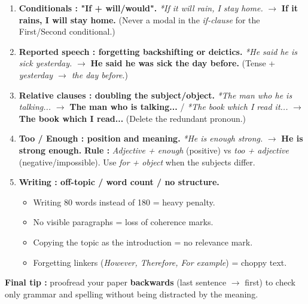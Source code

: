 \documentclass[11pt]{article}
\begin{document}
\begin{attention}
\begin{enumerate}
    \item \textbf{Conditionals : "If + will/would".} \textit{*If it will rain, I stay home.} $\rightarrow$ \textbf{If it rains, I will stay home.} (Never a modal in the \textit{if-clause} for the First/Second conditional.)
    \item \textbf{Reported speech : forgetting backshifting or deictics.} \textit{*He said he is sick yesterday.} $\rightarrow$ \textbf{He said he was sick the day before.} (Tense + \textit{yesterday $\rightarrow$ the day before}.)
    \item \textbf{Relative clauses : doubling the subject/object.} \textit{*The man who he is talking...} $\rightarrow$ \textbf{The man who is talking...} / \textit{*The book which I read it...} $\rightarrow$ \textbf{The book which I read...} (Delete the redundant pronoun.)
    \item \textbf{Too / Enough : position and meaning.} \textit{*He is enough strong.} $\rightarrow$ \textbf{He is strong enough.} \textbf{Rule :} \textit{Adjective + enough} (positive) vs \textit{too + adjective} (negative/impossible). Use \textit{for + object} when the subjects differ.
    \item \textbf{Writing : off-topic / word count / no structure.}
    \begin{itemize}
        \item Writing 80 words instead of 180 = heavy penalty.
        \item No visible paragraphs = loss of coherence marks.
        \item Copying the topic as the introduction = no relevance mark.
        \item Forgetting linkers (\textit{However, Therefore, For example}) = choppy text.
    \end{itemize}
\end{enumerate}
\textbf{Final tip :} proofread your paper \textbf{backwards} (last sentence $\rightarrow$ first) to check only grammar and spelling without being distracted by the meaning.
\end{attention}
\end{document}
